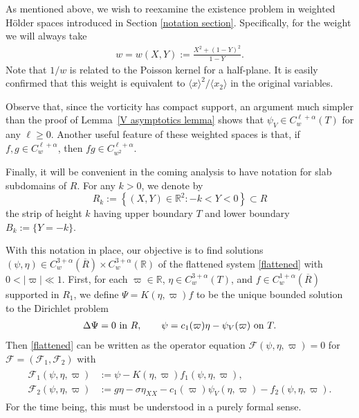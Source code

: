 \documentclass[11pt,reqno]{amsart}
\newcommand{\jbracket}[1]{\langle{#1}\rangle}
\newcommand\F{\mathcal F}
\newcommand{\R}{\mathbb{R}}
\theoremstyle{plain}
\theoremstyle{remark}
\numberwithin{equation}{section}
\begin{document}
As mentioned above, we wish to reexamine the existence problem in weighted H\"older spaces introduced in Section \ref{notation section}.  Specifically, for the weight we will always take
\begin{align*}
  w = w(X,Y) := \frac{X^2+(1-Y)^2}{1-Y}.
\end{align*}
Note that $1/w$ is related to the Poisson kernel for a half-plane. It is easily confirmed that this weight is equivalent to $\jbracket x^2/\jbracket{x_2}$ in the original variables.

Observe that, since the vorticity has compact support, 
an argument much simpler than the proof of Lemma~\ref{V asymptotics lemma} shows that $\psi_V \in C_w^{\ell+\alpha}(T)$ for any $\ell \geq 0$. Another useful feature of these weighted spaces is that, if $f, g \in C^{\ell+\alpha}_w$, then $fg \in C^{\ell+\alpha}_{w^2}$.

Finally, it will be convenient in the coming analysis to have notation for slab subdomains of $R$.  For any $k > 0$, we denote by
\[ R_k := \left\{ (X,Y) \in \R^2 :  -k < Y < 0 \right\} \subset R\]
the strip of height $k$ having upper boundary $T$ and lower boundary $B_k := \{ Y =
-k\}$. 

With this notation in place, our objective is to find solutions $(\psi,\eta) \in C^{3+\alpha}_w(\overline R) \times C^{3+\alpha}_w(\R)$ of the flattened system \eqref{flattened} with $0 < |\varpi| \ll 1$.  
First, for each $\varpi \in \R$, $\eta \in C^{3+\alpha}_w(T)$, and $f
\in C^{1+\alpha}_w(\overline R)$ supported in $R_1$, we define
$\Psi = K(\eta,\varpi) f$ to be the unique bounded solution to the Dirichlet
problem
\begin{align*}
  \Delta\Psi = 0 \textup{~in~} R,
  \qquad 
  \psi = c_1(\varpi)\eta - \psi_V(\varpi) \textup{~on~} T.
\end{align*}
Then \eqref{flattened} can be written as the operator equation $\F(\psi,\eta,\varpi) = 0$ for $\mathcal{F} = (\mathcal{F}_1,\mathcal{F}_2)$ with
\begin{align}
  \label{F def}
  \begin{aligned}
    \F_1(\psi,\eta,\varpi) &:= 
    \psi - K(\eta,\varpi) f_1(\psi,\eta,\varpi),\\
    \F_2(\psi,\eta,\varpi) &:= 
    g\eta - \sigma \eta_{XX}  - c_1(\varpi)\psi_V(\eta,\varpi) - f_2(\psi,\eta,\varpi).
  \end{aligned}
\end{align}
For the time being, this must be understood in a purely formal sense. 
\end{document}
